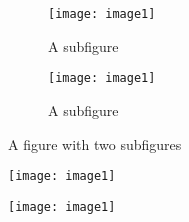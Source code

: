 \documentclass{article}
\begin{document}
\begin{figure}
\centering
\begin{subfigure}{.5\textwidth}
  \centering
  \texttt{[image: image1]}
  \caption{A subfigure}
  \label{fig:sub1}
\end{subfigure}%
\begin{subfigure}{.5\textwidth}
  \centering
  \texttt{[image: image1]}
  \caption{A subfigure}
  \label{fig:sub2}
\end{subfigure}
\caption{A figure with two subfigures}
\label{fig:test}
\end{figure}

\begin{figure}
\centering
\begin{minipage}{.5\textwidth}
  \centering
  \texttt{[image: image1]}
  \label{fig:test1}
\end{minipage}%
\begin{minipage}{.5\textwidth}
  \centering
  \texttt{[image: image1]}
  \label{fig:test2}
\end{minipage}
\end{figure}
\end{document}
